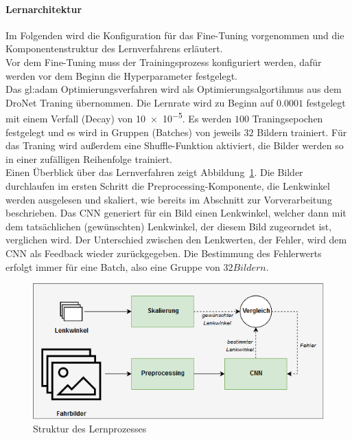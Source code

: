 \paragraph{Lernarchitektur}
Im Folgenden wird die Konfiguration für das Fine-Tuning vorgenommen und die Komponentenstruktur des Lernverfahrens erläutert.\\
Vor dem Fine-Tuning muss der Trainingsprozess konfiguriert werden, dafür werden vor dem Beginn die Hyperparameter festgelegt.\\
Das \gls{gl:adam} Optimierungsverfahren \cite{kingma2014adam} wird als Optimierungsalgortihmus aus dem DroNet Traning übernommen.
Die Lernrate wird zu Beginn auf $0.0001$ festgelegt mit einem Verfall (Decay) von \num{10e-5}. Es werden $100$ Traningsepochen festgelegt und es wird in Gruppen (Batches) von jeweils $32$ Bildern trainiert. Für das Traning wird außerdem eine Shuffle-Funktion aktiviert, die Bilder werden so in einer zufälligen Reihenfolge trainiert.\\
Einen Überblick über das Lernverfahren zeigt Abbildung~\ref{img:lernarchitektur}. Die Bilder durchlaufen im ersten Schritt die Preprocessing-Komponente, die Lenkwinkel werden ausgelesen und skaliert, wie bereits im Abschnitt zur Vorverarbeitung beschrieben. Das CNN generiert für ein Bild einen Lenkwinkel, welcher dann mit dem tatsächlichen (gewünschten) Lenkwinkel, der diesem Bild zugeorndet ist, verglichen wird. Der Unterschied zwischen den Lenkwerten, der Fehler, wird dem CNN als Feedback wieder zurückgegeben. Die Bestimmung des Fehlerwerts erfolgt immer für eine Batch, also eine Gruppe von $32 Bildern$. \\

\begin{figure}[h]
	\centering
	\includegraphics[width=\linewidth]{figures/Lernarchitektur.png}
	\caption{Struktur des Lernprozesses}
	\label{img:lernarchitektur}
\end{figure}

